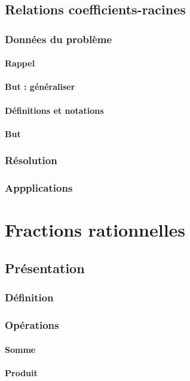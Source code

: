 \documentclass[12pt,a4paper,french]{book}
\begin{document}
	\section{Relations coefficients-racines}
		\subsection{Données du problème}
			\subsubsection{Rappel}
			\subsubsection{But : généraliser}
			\subsubsection{Définitions et notations}
			\subsubsection{But}
		\subsection{Résolution}
		\subsection{Appplications}
		
\chapter{Fractions rationnelles}
	\section{Présentation}
		\subsection{Définition}
		\subsection{Opérations}
			\subsubsection{Somme}
			\subsubsection{Produit}
\end{document}
